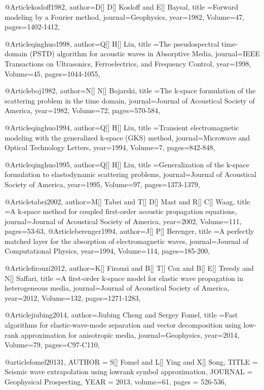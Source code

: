 {@Article{kosloff1982,
  author={D[] D[] Kosloff and E[] Baysal},
  title ={Forward modeling by a Fourier method},
  journal={Geophysics},
  year=1982,
  Volume=47,
  pages={1402-1412},
}

@Article{qinghuo1998,
  author={Q[] H[] Liu},
  title ={The pseudospectral time-domain (PSTD) algorithm for acoustic waves in Absorptive Media},
  journal={IEEE Transactions on Ultrasonics, Ferroelectrics, and Frequency Control},
  year=1998,
  Volume=45,
  pages={1044-1055},
}

@Article{boj1982,
  author={N[] N[] Bojarski},
  title ={The k-space formulation of the scattering problem in the time domain},
  journal={Journal of Acoustical Society of America},
  year=1982,
  Volume=72,
  pages={570-584},
}


@Article{qinghuo1994,
  author={Q[] H[] Liu},
  title ={Transient electromagnetic modeling with the generalized k-space (GKS) method},
  journal={Microwave and Optical Technology Letters},
  year=1994,
  Volume=7,
  pages={842-848},
}

@Article{qinghuo1995,
  author={Q[] H[] Liu},
  title ={Generalization of the k-space formulation to elastodynamic scattering problems},
  journal={Journal of Acoustical Society of America},
  year=1995,
  Volume=97,
  pages={1373-1379},
}

@Article{tabei2002,
  author={M[] Tabei and T[] D[] Mast and R[] C[] Waag},
  title ={A k-space method for coupled first-order acoustic propagation equations},
  journal={Journal of Acoustical Society of America},
  year=2002,
  Volume=111,
  pages={53-63},
}
@Article{berenger1994,
  author={J[] P[] Berenger},
  title ={A perfectly matched layer for the absorption of electromagnetic waves},
  journal={Journal of Computational Physics},
  year=1994,
  Volume=114,
  pages={185-200},
}

@Article{firouzi2012,
  author={K[] Firouzi and B[] T[] Cox and B[] E[] Treedy and N[] Saffari},
  title ={A first-order k-space model for elastic wave propagation in heterogeneous media},
  journal={Journal of Acoustical Society of America},
  year=2012,
  Volume=132,
  pages={1271-1283},
}


@Article{jiubing2014,
  author={Jiubing Cheng and Sergey Fomel},
  title ={Fast algorithms for elastic-wave-mode separation and vector decomposition using low-rank approximation for anisotropic media},
  journal={Geophysics},
  year=2014,
  Volume=79,
  pages={C97-C110},
}

@article{fomel20131,
  AUTHOR =       {S[] Fomel and L[] Ying and X[] Song},
  TITLE =        {Seismic wave extrapolation using lowrank symbol approximation},
  JOURNAL =      {Geophysical Prospecting},
  YEAR =         {2013},
  volume=61,
  pages = {526-536},
}

}
